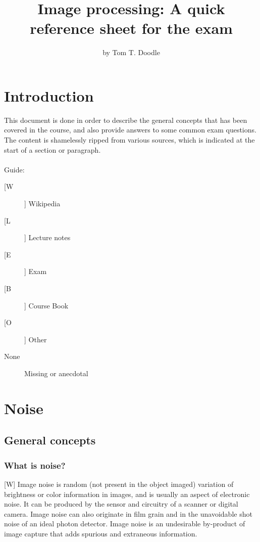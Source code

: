 \documentclass[12pt]{article}
\title{Image processing: A quick reference sheet for the exam}
\author{by Tom T. Doodle}
\begin{document}
\maketitle
\newpage
\tableofcontents
\newpage

\section{Introduction}
	This document is done in order to describe the general concepts
	that has been covered in the course, and also provide answers to
	some common exam questions. The content is shamelessly ripped from
	various sources, which is indicated at the start of a section
	or paragraph.\\
	\\	
	Guide:
	\begin{description}
		\item[[W]] Wikipedia
		\item[[L]] Lecture notes
		\item[[E]] Exam
		\item[[B]] Course Book
		\item[[O]] Other
		\item[None] Missing or anecdotal
	\end{description}
	
%	
%
\section{Noise}
	\subsection{General concepts}
	\subsubsection{What is noise?}
	
	[W] Image noise is random (not present in the object imaged) variation of brightness or
	color information in images, and is usually an aspect of electronic noise. It can be
	produced by the sensor and circuitry of a scanner or digital camera. Image noise can
	also originate in film grain and in the unavoidable shot noise of an ideal photon 
	detector. Image noise is an undesirable by-product of image capture that adds spurious 
	and extraneous information.\\
	
\end{document}
